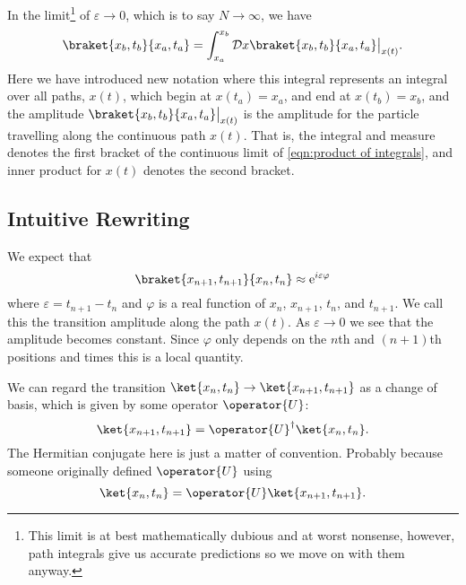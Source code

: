 \documentclass[fleqn]{NotesClass}
\newcommand*{\e}{\mathrm{e}}
\newcommand*{\hermit}{\dagger}
\begin{document}
    In the limit\footnote{This limit is at best mathematically dubious and at worst nonsense, however, path integrals give us accurate predictions so we move on with them anyway.} of \(\varepsilon \to 0\), which is to say \(N \to \infty\), we have
    \begin{equation}
        \braket{x_b, t_b}{x_a, t_a} = \int_{x_a}^{x_b} \DL{x} \braket{x_b, t_b}{x_a, t_a}\big\vert_{x(t)}.
    \end{equation}
    Here we have introduced new notation where this integral represents an integral over all paths, \(x(t)\), which begin at \(x(t_a) = x_a\), and end at \(x(t_b) = x_b\), and the amplitude \(\braket{x_b, t_b}{x_a, t_a}\big\vert_{x(t)}\) is the amplitude for the particle travelling along the continuous path \(x(t)\).
    That is, the integral and measure denotes the first bracket of the continuous limit of \cref{eqn:product of integrals}, and inner product for \(x(t)\) denotes the second bracket.
    
    \subsection{Intuitive Rewriting}\label{sec:intuitive rewriting}
    We expect that
    \begin{equation}
        \braket{x_{n+1}, t_{n+1}}{x_n, t_n} \approx \e^{i\varepsilon\varphi}
    \end{equation}
    where \(\varepsilon = t_{n+1} - t_n\) and \(\varphi\) is a real function of \(x_n\), \(x_{n+1}\), \(t_n\), and \(t_{n+1}\).
    We call this the transition amplitude along the path \(x(t)\).
    As \(\varepsilon \to 0\) we see that the amplitude becomes constant.
    Since \(\varphi\) only depends on the \(n\)th and \((n + 1)\)th positions and times this is a local quantity.
    
    We can regard the transition \(\ket{x_n, t_n} \to \ket{x_{n+1}, t_{n+1}}\) as a change of basis, which is given by some operator \(\operator{U}\):
    \begin{equation}
        \ket{x_{n+1}, t_{n+1}} = \operator{U}^\hermit \ket{x_n, t_n}.
    \end{equation}
    The Hermitian conjugate here is just a matter of convention.
    Probably because someone originally defined \(\operator{U}\) using
    \begin{equation}
        \ket{x_n, t_n} = \operator{U}\ket{x_{n+1}, t_{n+1}}.
    \end{equation}
    
\end{document}

